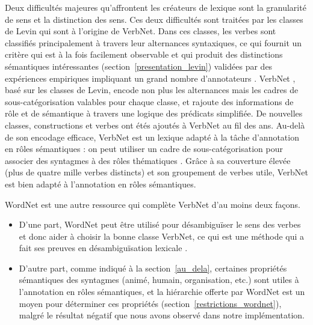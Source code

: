 
Deux difficultés majeures qu'affrontent les créateurs de lexique sont la
granularité de sens et la distinction des sens. Ces deux difficultés sont
traitées par les classes de Levin \citep{levin1993english} qui sont à l'origine
de VerbNet. Dans ces classes, les verbes sont classifiés principalement à
travers leur alternances syntaxiques, ce qui fournit un critère qui est à la
fois facilement observable et qui produit des distinctions sémantiques
intéressantes (section~\ref{presentation_levin}) validées par des expériences
empiriques impliquant un grand nombre d'annotateurs
\citep{hartshorne2014verbcorner}.  VerbNet \citep{kipperschuler2005verbnet},
basé sur les classes de Levin, encode non plus les alternances mais les cadres
de sous-catégorisation valables pour chaque classe, et rajoute des informations
de rôle et de sémantique à travers une logique des prédicats simplifiée. De
nouvelles classes, constructions et verbes ont étés ajoutés à VerbNet au fil
des ans. Au-delà de son encodage efficace, VerbNet est un lexique adapté à la
tâche d'annotation en rôles sémantiques : on peut utiliser un cadre de
sous-catégorisation pour associer des syntagmes à des rôles thématiques
\citep{swier2005exploiting,pradet2013revisiting}. Grâce à sa couverture élevée
(plus de quatre mille verbes distincts) et son groupement de verbes utile,
VerbNet est bien adapté à l'annotation en rôles sémantiques.


WordNet \citep{fellbaum1998wordnet} est une autre ressource qui complète
VerbNet d'au moins deux façons.

\begin{itemize}
    \item D'une part, WordNet peut être utilisé pour désambiguïser le sens des
        verbes et donc aider à choisir la bonne classe VerbNet, ce qui est une
        méthode qui a fait ses preuves en désambiguïsation lexicale
        \citep{agirre2009personalizing}.
    \item D'autre part, comme indiqué à la section~\ref{au_dela}, certaines
        propriétés sémantiques des syntagmes (animé, humain, organisation,
        etc.) sont utiles à l'annotation en rôles sémantiques, et la hiérarchie
        offerte par WordNet est un moyen pour déterminer ces propriétés
        (section~\ref{restrictions_wordnet}), malgré le résultat négatif que
        nous avons observé dans notre implémentation.
\end{itemize}

